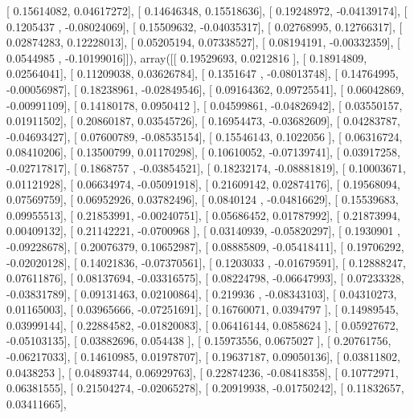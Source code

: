 \documentclass{article}
\begin{document}
       [ 0.15614082,  0.04617272],
       [ 0.14646348,  0.15518636],
       [ 0.19248972, -0.04139174],
       [ 0.1205437 , -0.08024069],
       [ 0.15509632, -0.04035317],
       [ 0.02768995,  0.12766317],
       [ 0.02874283,  0.12228013],
       [ 0.05205194,  0.07338527],
       [ 0.08194191, -0.00332359],
       [ 0.0544985 , -0.10199016]]), array([[ 0.19529693,  0.0212816 ],
       [ 0.18914809,  0.02564041],
       [ 0.11209038,  0.03626784],
       [ 0.1351647 , -0.08013748],
       [ 0.14764995, -0.00056987],
       [ 0.18238961, -0.02849546],
       [ 0.09164362,  0.09725541],
       [ 0.06042869, -0.00991109],
       [ 0.14180178,  0.0950412 ],
       [ 0.04599861, -0.04826942],
       [ 0.03550157,  0.01911502],
       [ 0.20860187,  0.03545726],
       [ 0.16954473, -0.03682609],
       [ 0.04283787, -0.04693427],
       [ 0.07600789, -0.08535154],
       [ 0.15546143,  0.1022056 ],
       [ 0.06316724,  0.08410206],
       [ 0.13500799,  0.01170298],
       [ 0.10610052, -0.07139741],
       [ 0.03917258, -0.02717817],
       [ 0.1868757 , -0.03854521],
       [ 0.18232174, -0.08881819],
       [ 0.10003671,  0.01121928],
       [ 0.06634974, -0.05091918],
       [ 0.21609142,  0.02874176],
       [ 0.19568094,  0.07569759],
       [ 0.06952926,  0.03782496],
       [ 0.0840124 , -0.04816629],
       [ 0.15539683,  0.09955513],
       [ 0.21853991, -0.00240751],
       [ 0.05686452,  0.01787992],
       [ 0.21873994,  0.00409132],
       [ 0.21142221, -0.0700968 ],
       [ 0.03140939, -0.05820297],
       [ 0.1930901 , -0.09228678],
       [ 0.20076379,  0.10652987],
       [ 0.08885809, -0.05418411],
       [ 0.19706292, -0.02020128],
       [ 0.14021836, -0.07370561],
       [ 0.1203033 , -0.01679591],
       [ 0.12888247,  0.07611876],
       [ 0.08137694, -0.03316575],
       [ 0.08224798, -0.06647993],
       [ 0.07233328, -0.03831789],
       [ 0.09131463,  0.02100864],
       [ 0.219936  , -0.08343103],
       [ 0.04310273,  0.01165003],
       [ 0.03965666, -0.07251691],
       [ 0.16760071,  0.0394797 ],
       [ 0.14989545,  0.03999144],
       [ 0.22884582, -0.01820083],
       [ 0.06416144,  0.0858624 ],
       [ 0.05927672, -0.05103135],
       [ 0.03882696,  0.054438  ],
       [ 0.15973556,  0.0675027 ],
       [ 0.20761756, -0.06217033],
       [ 0.14610985,  0.01978707],
       [ 0.19637187,  0.09050136],
       [ 0.03811802,  0.0438253 ],
       [ 0.04893744,  0.06929763],
       [ 0.22874236, -0.08418358],
       [ 0.10772971,  0.06381555],
       [ 0.21504274, -0.02065278],
       [ 0.20919938, -0.01750242],
       [ 0.11832657,  0.03411665],
\end{document}
